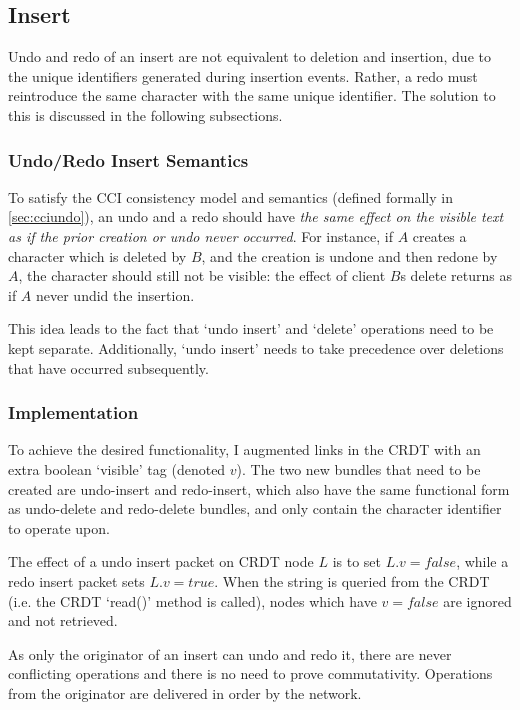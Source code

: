 \documentclass[12pt,a4paper,twoside,openright]{report}
\begin{document}
	
	\subsection{Insert}
	Undo and redo of an insert are not equivalent to deletion and insertion, due to the unique identifiers generated during insertion events. Rather, a redo must reintroduce the same character with the same unique identifier. The solution to this is discussed in the following subsections.
	
		\subsubsection{Undo/Redo Insert Semantics}
		To satisfy the CCI consistency model and semantics (defined formally in \cref{sec:cciundo}), an undo and a redo should have \textit{the same effect on the visible text as if the prior creation or undo never occurred}. For instance, if $A$ creates a character which is deleted by $B$, and the creation is undone and then redone by $A$, the character should still not be visible: the effect of client $B$s delete returns as if $A$ never undid the insertion.
		
		This idea leads to the fact that `undo insert' and `delete' operations need to be kept separate. Additionally, `undo insert' needs to take precedence over deletions that have occurred subsequently.
		
		\subsubsection{Implementation}
		
		To achieve the desired functionality, I augmented links in the CRDT with an extra boolean `visible' tag (denoted $v$). The two new bundles that need to be created are undo-insert and redo-insert, which also have the same functional form as undo-delete and redo-delete bundles, and only contain the character identifier to operate upon.
		
		The effect of a undo insert packet on CRDT node $L$ is to set $L.v = false$, while a redo insert packet sets $L.v = true$. When the string is queried from the CRDT (i.e. the CRDT `read()' method is called), nodes which have $v = false$ are ignored and not retrieved.
		
		As only the originator of an insert can undo and redo it, there are never conflicting operations and there is no need to prove commutativity. Operations from the originator are delivered in order by the network.
		
\end{document}

